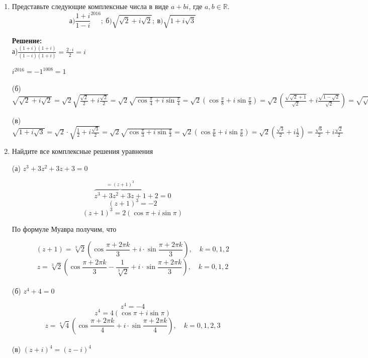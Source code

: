 \documentclass[]{book}
\theoremstyle{definition}
\newcommand{\bb}[1]{\mathbb{#1}}
\begin{document}
\begin{enumerate}[resume]



\item Представьте следующие комплексные числа в виде $a + bi$, где $a, b \in \bb{R}$.
$$ \text{а)}{\frac{1+i}{1-i}}^{2016};\ \text{б)}\sqrt{\sqrt{2}+i\sqrt{2}};\ \text{в)}\sqrt{1+i\sqrt{3}}$$

\textbf{Решение:}
\\
а)$\frac{\left({1+i}\right)\left({1+i}\right)}{\left({1-i}\right)\left({1+i}\right)}=\frac{2\cdot{i}}{2}={i}$

${i}^{2016} = {-1}^{1008} ={1}$

(б) $\sqrt{\sqrt{2} + i\sqrt{2}} = \sqrt{2}\sqrt{\frac{\sqrt{2}}{2}+i\frac{\sqrt{2}}{2}} = \sqrt{2}\sqrt{\cos{\frac{\pi}{4}}+i\sin{\frac{\pi}{4}}} = \sqrt{2}(\cos{\frac{\pi}{8}}+i\sin{\frac{\pi}{8}}) = \sqrt{2}(\frac{\sqrt{\sqrt{2}+1}}{\sqrt{2}}+i\frac{\sqrt{1-\sqrt{2}}}{\sqrt{2}})= \sqrt{\sqrt{2}+1}+i\sqrt{1-\sqrt{2}} $

(в) $\sqrt{1 + i\sqrt{3}}= \sqrt{2}\cdot\sqrt{\frac{1}{2}+i\frac{\sqrt{3}}{2}} = \sqrt{2}\sqrt{\cos{\frac{\pi}{3}}+i\sin{\frac{\pi}{3}}}=\sqrt{2}(\cos{\frac{\pi}{6}}+i\sin{\frac{\pi}{6}})=\sqrt{2}(\frac{\sqrt{3}}{2}+i\frac{1}{2})= \frac{\sqrt{6}}{2}+i\frac{\sqrt{2}}{2}$





\item Найдите все комплексные решения уравнения

(а) $z^3 + 3z^2 + 3z + 3 = 0$

$$\overbrace{z^3 + 3z^2 + 3z + 1}^{= (z + 1)^3} + 2 = 0$$
$$(z + 1)^3 = -2$$
$$(z + 1)^3 = 2(\cos\pi + i\sin\pi)$$

По формуле Муавра получим, что

$$(z + 1) = \sqrt[3]{2}\left( \cos\frac{\pi + 2\pi k}{3} + i\cdot\sin\frac{\pi + 2\pi k}{3} \right), \quad k = 0, 1, 2$$
$$z = \sqrt[3]{2}\left(\cos\frac{\pi + 2\pi k}{3} - \frac{1}{\sqrt[3]{2}} + i\cdot\sin\frac{\pi + 2\pi k}{3} \right), \quad k = 0, 1, 2$$
\\

(б) $z^4 + 4 = 0$

$$z^4 = -4$$
$$z^4 = 4(\cos\pi + i\sin\pi)$$
$$z = \sqrt[4]{4}\left( \cos\frac{\pi + 2\pi k}{4} +  i\cdot\sin\frac{\pi + 2\pi k}{4}  \right), \quad k = 0, 1, 2, 3$$
\\

(в) $(z+i)^4 = (z-i)^4$


\end{enumerate}
\end{document}
